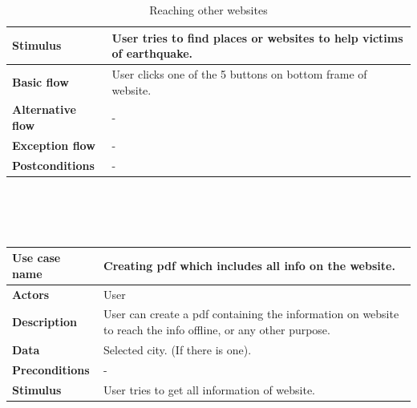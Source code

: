 \begin{center}
\begin{table}[H]
\begin{tabular}{| m{3cm}| m{10cm} |}
            \hline
            \textbf{Stimulus}         & User tries to find places or websites to help victims of earthquake. \\
            \hline
            \textbf{Basic flow}       & User clicks one of the 5 buttons on bottom frame of website.         \\
            \hline
            \textbf{Alternative flow} & -                                                                    \\
            \hline
            \textbf{Exception flow}   & -                                                                    \\
            \hline
            \textbf{Postconditions}   & -                                                                    \\
            \hline
        \end{tabular}
        \caption[Reaching other websites]{Reaching other websites}
    \end{table}
    ~\\~\\~\\
    \begin{table}[H]
        \begin{tabular}{| m{3cm}| m{10cm} |}
            \hline
            \textbf{Use case name}    & Creating pdf which includes all info on the website.                                                                                          \\
            \hline
            \textbf{Actors}           & User                                                                                                                                          \\
            \hline
            \textbf{Description}      & User can create a pdf containing the information on website to reach the info offline, or any other purpose.                                  \\
            \hline
            \textbf{Data}             & Selected city. (If there is one).                                                                                                             \\
            \hline
            \textbf{Preconditions}    & -                                                                                                                                             \\
            \hline
            \textbf{Stimulus}         & User tries to get all information of website.                                                                                                 \\

\end{tabular}
\end{table}
\end{center}
